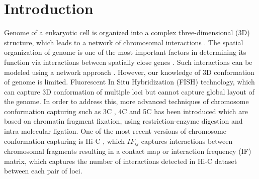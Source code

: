 \documentclass[]{article}
\begin{document}
\section{Introduction}
Genome of a eukaryotic cell is organized into a
complex three-dimensional (3D) structure, which
leads to a network of chromosomal interactions \cite{dekker2008gene}.
The spatial organization of genome is one of
the most important factors in determining its
function \cite{fraser2007nuclear} via interactions between
spatially close genes \cite{kagey2010mediator}. Such
interactions can be modeled using a network approach
\cite{kagey2010mediator}. However, our knowledge of
3D conformation of genome is limited. Fluorescent In
Situ Hybridization (FISH) technology, which can
capture 3D conformation of multiple loci but cannot
capture global layout of the genome. In order to
address this, more advanced techniques of chromosome
conformation capturing such as 3C \cite{dekker2002capturing},
4C \cite{simonis2006nuclear} and 5C \cite{dostie2007mapping}
has been introduced which are based on chromatin fragment
fixation, using restriction-enzyme digestion and
intra-molecular ligation. One of the most recent
versions of chromosome conformation capturing is
Hi-C \cite{rao20143d, lieberman2009comprehensive},
which $IF_{ij}$ captures interactions between chromosomal
fragments resulting in a contact map or interaction frequency
(IF) matrix, which captures the number of interactions
detected in Hi-C dataset between each pair of loci.
\end{document}
